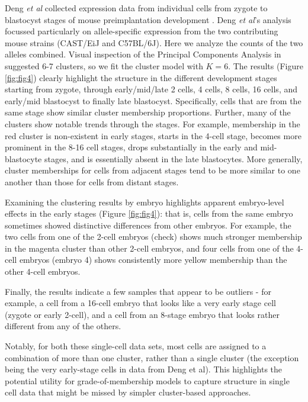 Deng \textit{et al} collected expression data from individual cells from zygote to blastocyst stages of mouse preimplantation development \cite{Deng2014}. Deng \textit{et al}'s analysis focussed particularly on allele-specific expression from the two contributing mouse strains (CAST/EiJ and C57BL/6J). Here we analyze the counts of the two alleles combined. Visual inspection of the Principal Components Analysis in \cite{Deng2014} suggested 6-7 clusters, so we fit the cluster model with $K=6$. 
The results (Figure \ref{fig:fig4}) clearly highlight the structure in the different development stages starting from zygote, through early/mid/late 2 cells, 4 cells, 8 cells, 16 cells, and early/mid blastocyst to finally late blastocyst. Specifically, cells that are from the same stage show similar cluster membership proportions. Further, many of the clusters show notable trends through the stages. For example, 
membership in the red cluster is non-existent in early stages, starts in the 4-cell stage, becomes more prominent in the 8-16 cell stages, drops substantially in the early and mid-blastocyte stages, and is essentially absent in the late blastocytes. More generally, cluster memberships for cells from adjacent stages tend to be more similar to one another than those for cells from distant stages. 

Examining the clustering results by embryo highlights apparent embryo-level effects in the early stages (Figure \ref{fig:fig4}): that is, cells from the same embryo sometimes showed distinctive differences from other embryos. For example, the two cells from one of the 2-cell embryos (check) shows much stronger membership in the magenta cluster than other 2-cell embryos, and four cells from one of the 4-cell embryos (embryo 4) shows consistently more yellow membership than the other 4-cell embryos. 

Finally, the results indicate a few samples that appear to be outliers - for example, a cell from a 16-cell embryo that looks like a very early stage cell (zygote or early 2-cell), and a cell from an 8-stage embryo that looks rather different from any of the others.

Notably, for both these single-cell data sets, most cells are assigned to a combination of more than one cluster, rather than a single cluster (the exception being the very early-stage cells in data from Deng et al). This highlights the potential utility for grade-of-membership models to capture structure in single cell data that might be missed by simpler cluster-based approaches.



